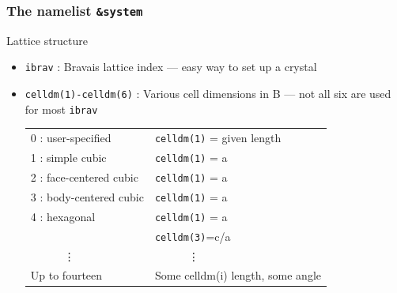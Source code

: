 \documentclass[]{beamer}
\def\t#1{{\texttt{#1}}}
\begin{document}
\begin{frame}
  \frametitle{The namelist \t{\&system}}
  \begin{block}{Lattice structure}
    \begin{itemize}
    \item<1-> \t{ibrav} : Bravais lattice index --- easy way to set up a crystal
    \item<2-> \t{celldm(1)-celldm(6)} : Various cell dimensions in B --- not all six are
    used for most \t{ibrav} \\
    \begin{center}
      \begin{tabular} { l | l }
        0 : user-specified   &   \t{celldm(1)} = given length\\
        1 : simple cubic     &   \t{celldm(1)} = a \\
        2 : face-centered cubic & \t{celldm(1)} = a \\
        3 : body-centered cubic & \t{celldm(1)} = a \\
        4 : hexagonal & \t{celldm(1)} = a \\
        & \t{celldm(3)}=c/a\\
        $\quad$$\quad$$\quad$\vdots & $\quad$$\quad$$\quad$\vdots \\
        Up to fourteen & Some celldm(i) length, some angle \\
      \end{tabular}
    \end{center}
    \end{itemize}
  \end{block}
\end{frame}
\end{document}
